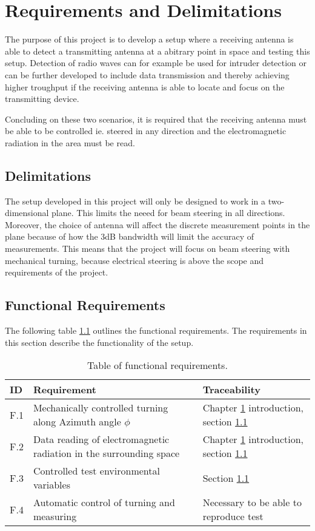 \chapter{Requirements and Delimitations} \label{ch:req}
The purpose of this project is to develop a setup where a receiving antenna is able to detect a transmitting antenna at a abitrary point in space and testing this setup. Detection of radio waves can for example be used for intruder detection or can be further developed to include data transmission and thereby achieving higher troughput if the receiving antenna is able to locate and focus on the transmitting device. 

Concluding on these two scenarios, it is required that the receiving antenna must be able to be controlled ie. steered in any direction and the electromagnetic radiation in the area must be read. 

\section{Delimitations} \label{sec:delimitations}
The setup developed in this project will only be designed to work in a two-dimensional plane. This limits the neeed for beam steering in all directions. Moreover, the choice of antenna will affect the discrete measurement points in the plane because of how the 3dB bandwidth will limit the accuracy of measurements. This means that the project will focus on beam steering with mechanical turning, because electrical steering is above the scope and requirements of the project.

\section{Functional Requirements}
The following table \ref{tab:func_req} outlines the functional requirements. The requirements in this section describe the functionality of the setup.
\begin{table}[H]
    \centering
    \begin{tabular}{p{}|>{\raggedright}p{}|p{}}
        \textbf{ID} & \textbf{Requirement} & \textbf{Traceability} \\
        \hline
        \hline
        F.1 & Mechanically controlled turning along Azimuth angle $\phi$ & Chapter \ref{ch:req} introduction, section \ref{sec:delimitations} \\
        F.2 & Data reading of electromagnetic radiation in the surrounding space & Chapter \ref{ch:req} introduction, section \ref{sec:delimitations} \\
        F.3 & Controlled test environmental variables & Section \ref{sec:delimitations} \\
        F.4 & Automatic control of turning and measuring & Necessary to be able to reproduce test \\
    \end{tabular}
    \caption{Table of functional requirements.}
    \label{tab:func_req}
\end{table}


